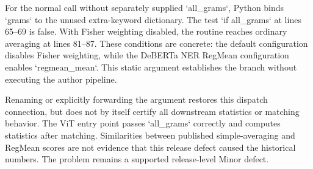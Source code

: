 \documentclass[10pt]{article}
\begin{document}
For the normal call without separately supplied `all\_grams`, Python binds `grams` to the unused extra-keyword dictionary. The test `if all\_grams` at lines 65–69 is false. With Fisher weighting disabled, the routine reaches ordinary averaging at lines 81–87. These conditions are concrete: the default configuration disables Fisher weighting, while the DeBERTa NER RegMean configuration enables `regmean\_mean`. This static argument establishes the branch without executing the author pipeline.\par
Renaming or explicitly forwarding the argument restores this dispatch connection, but does not by itself certify all downstream statistics or matching behavior. The ViT entry point passes `all\_grams` correctly and computes statistics after matching. Similarities between published simple-averaging and RegMean scores are not evidence that this release defect caused the historical numbers. The problem remains a supported release-level Minor defect.\par
\end{document}
